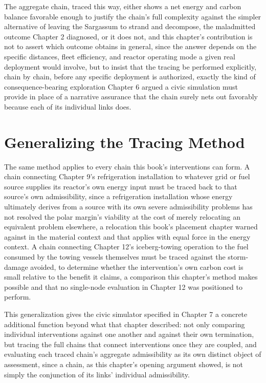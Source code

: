\documentclass[11pt,oneside]{book}
\begin{document}
The aggregate chain, traced this way, either shows a net energy and carbon balance favorable enough to justify the chain's full complexity against the simpler alternative of leaving the Sargassum to strand and decompose, the maladmitted outcome Chapter 2 diagnosed, or it does not, and this chapter's contribution is not to assert which outcome obtains in general, since the answer depends on the specific distances, fleet efficiency, and reactor operating mode a given real deployment would involve, but to insist that the tracing be performed explicitly, chain by chain, before any specific deployment is authorized, exactly the kind of consequence-bearing exploration Chapter 6 argued a civic simulation must provide in place of a narrative assurance that the chain surely nets out favorably because each of its individual links does.

\section*{Generalizing the Tracing Method}

The same method applies to every chain this book's interventions can form. A chain connecting Chapter 9's refrigeration installation to whatever grid or fuel source supplies its reactor's own energy input must be traced back to that source's own admissibility, since a refrigeration installation whose energy ultimately derives from a source with its own severe admissibility problems has not resolved the polar margin's viability at the cost of merely relocating an equivalent problem elsewhere, a relocation this book's placement chapter warned against in the material context and that applies with equal force in the energy context. A chain connecting Chapter 12's iceberg-towing operation to the fuel consumed by the towing vessels themselves must be traced against the storm-damage avoided, to determine whether the intervention's own carbon cost is small relative to the benefit it claims, a comparison this chapter's method makes possible and that no single-node evaluation in Chapter 12 was positioned to perform.

This generalization gives the civic simulator specified in Chapter 7 a concrete additional function beyond what that chapter described: not only comparing individual interventions against one another and against their own termination, but tracing the full chains that connect interventions once they are coupled, and evaluating each traced chain's aggregate admissibility as its own distinct object of assessment, since a chain, as this chapter's opening argument showed, is not simply the conjunction of its links' individual admissibility.
\end{document}

